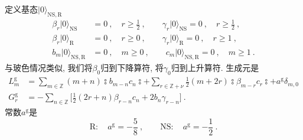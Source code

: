 定义基态$ \lvert 0\rangle _{\mathrm{NS,R}} $
\begin{subequations}
\begin{align}
    \beta_{r}\lvert 0\rangle_{\mathrm{NS}} &= 0\:, \quad r\geq \tfrac{1}{2}\:, \qquad
    \gamma_{r}\lvert 0\rangle_{\mathrm{NS}}=0 \:,\quad r\geq \tfrac{1}{2}\:, \label{10.4.3a} \\
    \beta_{r}\lvert 0\rangle_{\mathrm{R}} &=0 \:, \quad r\geq 0\:, \qquad
    \gamma_{r}\lvert 0\rangle _{\mathrm{R}} =0 \:, \quad r\geq 1\:, \label{10.4.3b} \\
    b_{m}\lvert 0\rangle_{\mathrm{NS,R}}&=0 \:,\quad m\geq 0\:, \qquad 
    c_{m}\lvert 0\rangle_{\mathrm{NS,R}}=0 \:,\quad m\geq 1 \:. \label{10.4.3c}
\end{align} \label{10.4.3}
\end{subequations}
与玻色情况类似, 我们将$ \beta_{0} $归到下降算符, 将$ \gamma_{0} $归到上升算符. 生成元是
\begin{subequations}
\begin{align}
    L_{m}^{\mathrm{g}}&=\sum_{m\in\mathds{Z}}(m+n)\typecolon\! b_{m-n}c_{n}\!\typecolon
    +\sum_{r\in\mathds{Z}+\nu} \frac{1}{2}(m+2r)\typecolon\! \beta_{m-r}c_{r}\!\typecolon + a^{\mathrm{g}}\delta_{m,0}\label{10.4.4a} \\
    G_{r}^{\mathrm{g}}&=-\sum_{n\in\mathds{Z}} 
    \biggl[\frac{1}{2}(2r+n)\beta_{r-n}c_{n}+2b_{n}\gamma_{r-n} \biggr] \:. \label{10.4.4b}
\end{align}
\end{subequations}
常数$ a^{\mathrm{g}} $是
\begin{equation}
    \mathrm{R}:\quad a^{\mathrm{g}}= -\frac{5}{8} \:, \qquad
    \mathrm{NS}:\quad a^{\mathrm{g}}= -\frac{1}{2} \:. \label{10.4.5} 
\end{equation}

